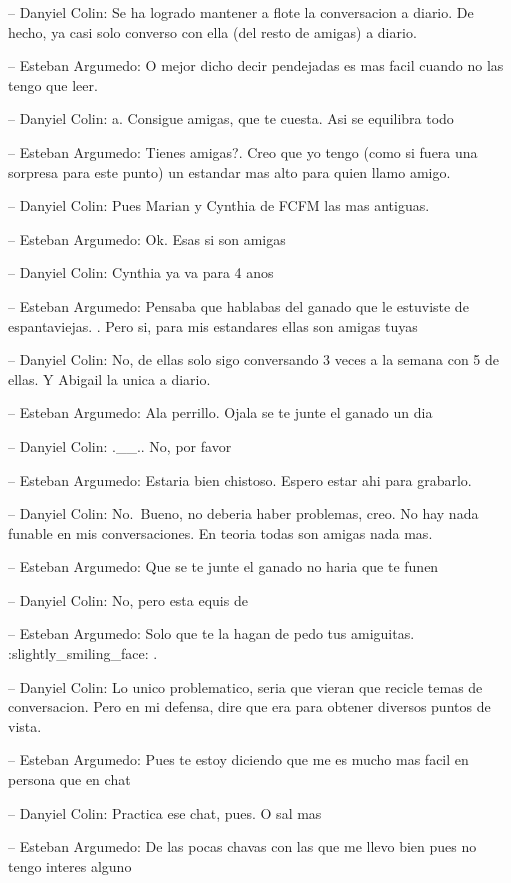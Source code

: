 -- Danyiel Colin: Se ha logrado mantener a flote la conversacion a
diario. De hecho, ya casi solo converso con ella (del resto de amigas) a
diario.

-- Esteban Argumedo: O mejor dicho decir pendejadas es mas facil cuando
no las tengo que leer.

-- Danyiel Colin: a. Consigue amigas, que te cuesta. Asi se equilibra
todo

-- Esteban Argumedo: Tienes amigas?. Creo que yo tengo (como si fuera
una sorpresa para este punto) un estandar mas alto para quien llamo
amigo.

-- Danyiel Colin: Pues Marian y Cynthia de FCFM las mas antiguas.

-- Esteban Argumedo: Ok. Esas si son amigas

-- Danyiel Colin: Cynthia ya va para 4 anos

-- Esteban Argumedo: Pensaba que hablabas del ganado que le estuviste de
espantaviejas. . Pero si, para mis estandares ellas son amigas tuyas

-- Danyiel Colin: No, de ellas solo sigo conversando 3 veces a la semana
con 5 de ellas. Y Abigail la unica a diario.

-- Esteban Argumedo: Ala perrillo. Ojala se te junte el ganado un dia

-- Danyiel Colin: .\_\_.. No, por favor

-- Esteban Argumedo: Estaria bien chistoso. Espero estar ahi para
grabarlo.

-- Danyiel Colin: No.~Bueno, no deberia haber problemas, creo. No hay
nada funable en mis conversaciones. En teoria todas son amigas nada mas.

-- Esteban Argumedo: Que se te junte el ganado no haria que te funen

-- Danyiel Colin: No, pero esta equis de

-- Esteban Argumedo: Solo que te la hagan de pedo tus amiguitas.
:slightly\_smiling\_face: .

-- Danyiel Colin: Lo unico problematico, seria que vieran que recicle
temas de conversacion. Pero en mi defensa, dire que era para obtener
diversos puntos de vista.

-- Esteban Argumedo: Pues te estoy diciendo que me es mucho mas facil en
persona que en chat

-- Danyiel Colin: Practica ese chat, pues. O sal mas

-- Esteban Argumedo: De las pocas chavas con las que me llevo bien pues
no tengo interes alguno

